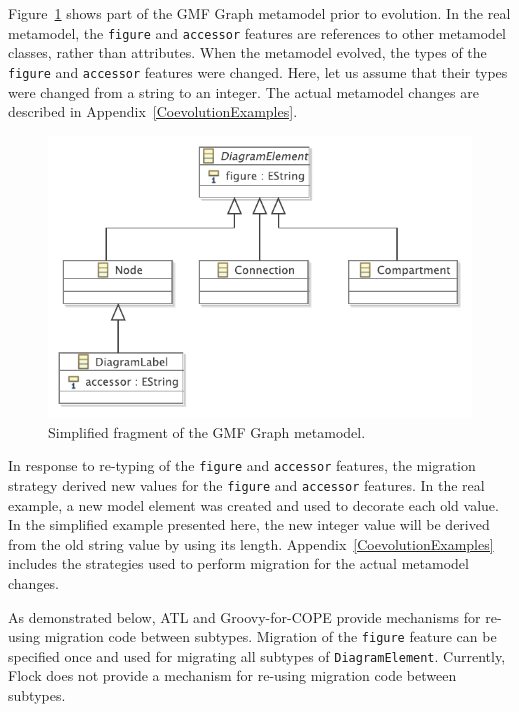 Figure~\ref{fig:subtyping} shows part of the GMF Graph metamodel prior to evolution. In the real metamodel, the \texttt{figure} and \texttt{accessor} features are references to other metamodel classes, rather than attributes. When the metamodel evolved, the types of the \texttt{figure} and \texttt{accessor} features were changed. Here, let us assume that their types were changed from a string to an integer. The actual metamodel changes are described in Appendix~\ref{CoevolutionExamples}.

\begin{figure}[htbp]
  \centering
  \includegraphics[scale=0.75]{6.Evaluation/images/subtyping.pdf}
  \caption{Simplified fragment of the GMF Graph metamodel.}
  \label{fig:subtyping}
\end{figure}

In response to re-typing of the \texttt{figure} and \texttt{accessor} features, the
migration strategy derived new values for the \texttt{figure} and \texttt{accessor} features. In the real example, a new model element was created and used to decorate \cite{gamma95patterns} each old value. In the simplified example presented here, the new integer value will be derived from the old string value by using its length. Appendix~\ref{CoevolutionExamples} includes the strategies used to perform migration for the actual metamodel changes.

As demonstrated below, ATL and Groovy-for-COPE provide mechanisms for re-using migration code between subtypes. Migration of the \texttt{figure} feature can be specified once and used for migrating all subtypes of \texttt{DiagramElement}. Currently, Flock does not provide a mechanism for re-using migration code between subtypes.

